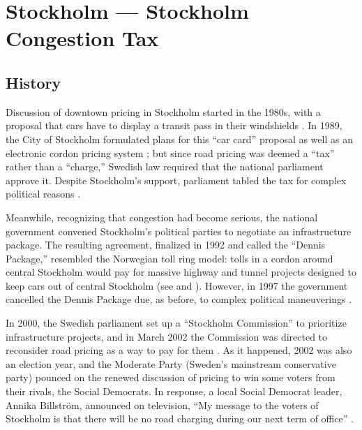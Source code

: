 \section{Stockholm --- Stockholm Congestion Tax}


\subsection{History}

Discussion of downtown pricing in Stockholm started in the 1980s, with a proposal that cars have to display a transit pass in their windshields \citep{GullbergIsaksson2009,Arnott2005}. In 1989, the City of Stockholm formulated plans for this ``car card'' proposal as well as an electronic cordon pricing system \citep[p. 90]{Hau1992}; but since road pricing was deemed a ``tax'' rather than a ``charge,'' Swedish law required that the national parliament approve it. Despite Stockholm's support, parliament tabled the tax for complex political reasons \citep{Ahlstrand2001}. 

Meanwhile, recognizing that congestion had become serious, the national government convened Stockholm's political parties to negotiate an infrastructure package. The resulting agreement, finalized in 1992 and called the ``Dennis Package,'' resembled the Norwegian toll ring model: tolls in a cordon around central Stockholm would pay for massive highway and tunnel projects designed to keep cars out of central Stockholm (see \citet[pp. 39-40]{Gomez-Ibanez1994} and \citet[p. 92]{Hau1992}). However, in 1997 the government cancelled the Dennis Package due, as before, to complex political maneuverings \citep{Ahlstrand2001,GullbergIsaksson2009}.

In 2000, the Swedish parliament set up a ``Stockholm Commission'' to  prioritize infrastructure projects, and in March 2002 the Commission was directed to reconsider road pricing as a way to pay for them \citep{Eliasson2009b}. As it happened, 2002 was also an election year, and the Moderate Party (Sweden's mainstream conservative party) pounced on the renewed discussion of pricing to win some voters from their rivals, the Social Democrats. In response, a local Social Democrat leader, Annika Billstr\"om, announced on television, ``My message to the voters of Stockholm is that there will be no road charging during our next term of office'' \citep{GullbergIsaksson2009}.

